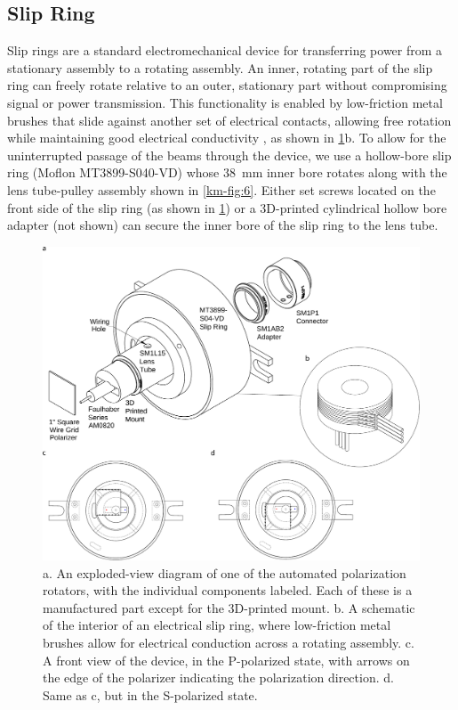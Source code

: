 \subsection{Slip Ring}

Slip rings are a standard electromechanical device for transferring power from a stationary assembly to a rotating assembly.
An inner, rotating part of the slip ring can freely rotate relative to an outer, stationary part without compromising signal or power transmission.
This functionality is enabled by low-friction metal brushes that slide against another set of electrical contacts, allowing free rotation while maintaining good electrical conductivity \citep{Argibay2010AsymmetricEnvironment}, as shown in \cref{km-fig:3}b.
To allow for the uninterrupted passage of the beams through the device, we use a hollow-bore slip ring (Moflon MT3899-S040-VD) whose \qty{38}{mm} inner bore rotates along with the lens tube-pulley assembly shown in \cref{km-fig:6}.
Either set screws located on the front side of the slip ring (as shown in \cref{km-fig:3}) or a 3D-printed cylindrical hollow bore adapter (not shown) can secure the inner bore of the slip ring to the lens tube.

\begin{figure}
\centering
\includegraphics[width=\textwidth]{gfx/ch4/km-fig3.pdf}
\caption[Exploded-view diagram of one of the automated polarization rotators]{
a. An exploded-view diagram of one of the automated polarization rotators, with the individual components labeled.
Each of these is a manufactured part except for the 3D-printed mount.
b. A schematic of the interior of an electrical slip ring, where low-friction metal brushes allow for electrical conduction across a rotating assembly.
c. A front view of the device, in the P-polarized state, with arrows on the edge of the polarizer indicating the polarization direction.
d. Same as c, but in the S-polarized state.}
\label{km-fig:3}
\end{figure}

